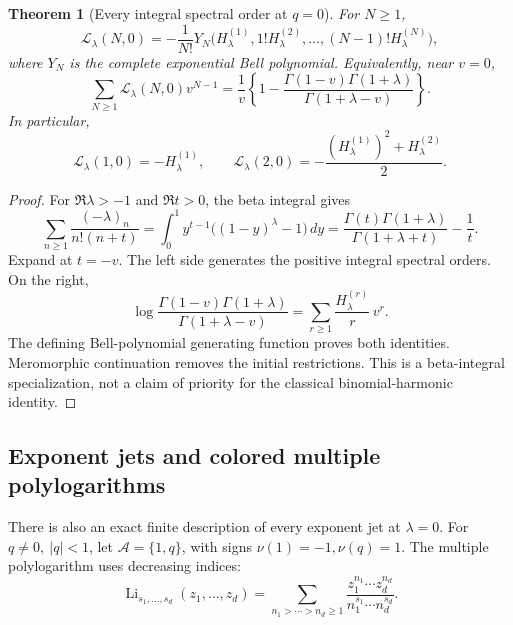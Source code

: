 \documentclass[11pt]{article}
\numberwithin{equation}{section}
\theoremstyle{plain}
\newtheorem{theorem}{Theorem}[section]
\theoremstyle{definition}
\theoremstyle{remark}
\begin{document}
\begin{theorem}[Every integral spectral order at \(q=0\)]
\label{bhr:cxp:thm:gamma}
For \(N\ge1\),
\begin{equation}\label{bhr:cxp:eq:Bell}
 \mathcal L_\lambda(N,0)
 =-\frac1{N!}Y_N\bigl(
     H_\lambda^{(1)},1!H_\lambda^{(2)},\ldots,
                          (N-1)!H_\lambda^{(N)}\bigr),
\end{equation}
where \(Y_N\) is the complete exponential Bell polynomial.
Equivalently, near \(v=0\),
\begin{equation}\label{bhr:cxp:eq:beta-generator}
 \sum_{N\ge1}\mathcal L_\lambda(N,0)v^{N-1}
 =\frac1v\left\{
 1-\frac{\Gamma(1-v)\Gamma(1+\lambda)}
                 {\Gamma(1+\lambda-v)}\right\}.
\end{equation}
In particular,
\[
 \mathcal L_\lambda(1,0)=-H_\lambda^{(1)},\qquad
 \mathcal L_\lambda(2,0)
 =-\frac{(H_\lambda^{(1)})^2+H_\lambda^{(2)}}2.
\]
\end{theorem}

\begin{proof}
For \(\Re\lambda>-1\) and \(\Re t>0\), the beta integral gives
\[
 \sum_{n\ge1}\frac{(-\lambda)_n}{n!(n+t)}
  =\int_0^1 y^{t-1}\bigl((1-y)^\lambda-1\bigr)\,dy
  =\frac{\Gamma(t)\Gamma(1+\lambda)}
           {\Gamma(1+\lambda+t)}-\frac1t.
\]
Expand at \(t=-v\).  The left side generates the positive
integral spectral orders.  On the right,
\[
 \log\frac{\Gamma(1-v)\Gamma(1+\lambda)}
              {\Gamma(1+\lambda-v)}
   =\sum_{r\ge1}\frac{H_\lambda^{(r)}}r\,v^r.
\]
The defining Bell-polynomial generating function proves both
identities.  Meromorphic continuation removes the initial
restrictions.  This is a beta-integral specialization, not a claim
of priority for the classical binomial-harmonic identity.
\end{proof}

\subsection{Exponent jets and colored multiple polylogarithms}

There is also an exact finite description of every exponent jet at
\(\lambda=0\).  For \(q\ne0,\ |q|<1\), let
\(\mathcal A=\{1,q\}\), with signs \(\nu(1)=-1,\nu(q)=1\).
The multiple polylogarithm uses decreasing indices:
\[
 \operatorname{Li}_{s_1,\ldots,s_d}(z_1,\ldots,z_d)
 =\sum_{n_1>\cdots>n_d\ge1}
       \frac{z_1^{n_1}\cdots z_d^{n_d}}
            {n_1^{s_1}\cdots n_d^{s_d}}.
\]
\end{document}
